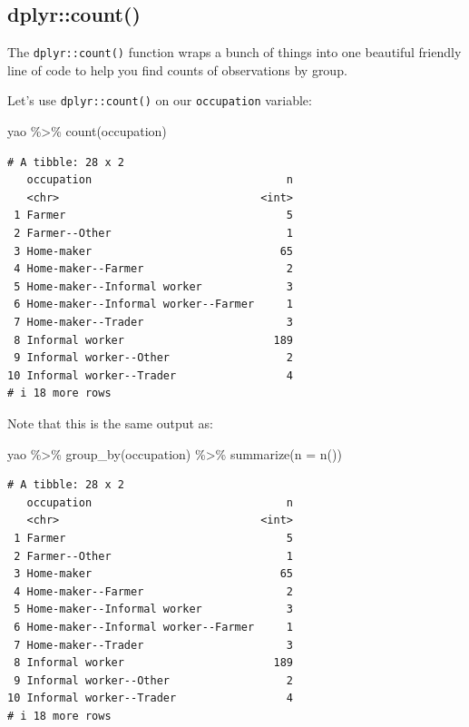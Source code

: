 \documentclass[
  letterpaper,
  DIV=11,
  numbers=noendperiod]{scrreprt}
\newenvironment{Shaded}{\begin{snugshade}}{\end{snugshade}}
\newcommand{\AttributeTok}[1]{\textcolor[rgb]{0.40,0.45,0.13}{#1}}
\newcommand{\FunctionTok}[1]{\textcolor[rgb]{0.28,0.35,0.67}{#1}}
\newcommand{\NormalTok}[1]{\textcolor[rgb]{0.00,0.23,0.31}{#1}}
\newcommand{\SpecialCharTok}[1]{\textcolor[rgb]{0.37,0.37,0.37}{#1}}
\begin{document}
\subsection{dplyr::count()}\label{dplyrcount}

The \texttt{dplyr::count()} function wraps a bunch of things into one
beautiful friendly line of code to help you find counts of observations
by group.

Let's use \texttt{dplyr::count()} on our \texttt{occupation} variable:

\begin{Shaded}
\begin{Highlighting}[]
\NormalTok{yao }\SpecialCharTok{\%\textgreater{}\%}
  \FunctionTok{count}\NormalTok{(occupation)}
\end{Highlighting}
\end{Shaded}

\begin{verbatim}
# A tibble: 28 x 2
   occupation                              n
   <chr>                               <int>
 1 Farmer                                  5
 2 Farmer--Other                           1
 3 Home-maker                             65
 4 Home-maker--Farmer                      2
 5 Home-maker--Informal worker             3
 6 Home-maker--Informal worker--Farmer     1
 7 Home-maker--Trader                      3
 8 Informal worker                       189
 9 Informal worker--Other                  2
10 Informal worker--Trader                 4
# i 18 more rows
\end{verbatim}

Note that this is the same output as:

\begin{Shaded}
\begin{Highlighting}[]
\NormalTok{yao }\SpecialCharTok{\%\textgreater{}\%}
  \FunctionTok{group\_by}\NormalTok{(occupation) }\SpecialCharTok{\%\textgreater{}\%} 
  \FunctionTok{summarize}\NormalTok{(}\AttributeTok{n =} \FunctionTok{n}\NormalTok{())}
\end{Highlighting}
\end{Shaded}

\begin{verbatim}
# A tibble: 28 x 2
   occupation                              n
   <chr>                               <int>
 1 Farmer                                  5
 2 Farmer--Other                           1
 3 Home-maker                             65
 4 Home-maker--Farmer                      2
 5 Home-maker--Informal worker             3
 6 Home-maker--Informal worker--Farmer     1
 7 Home-maker--Trader                      3
 8 Informal worker                       189
 9 Informal worker--Other                  2
10 Informal worker--Trader                 4
# i 18 more rows
\end{verbatim}
\end{document}
